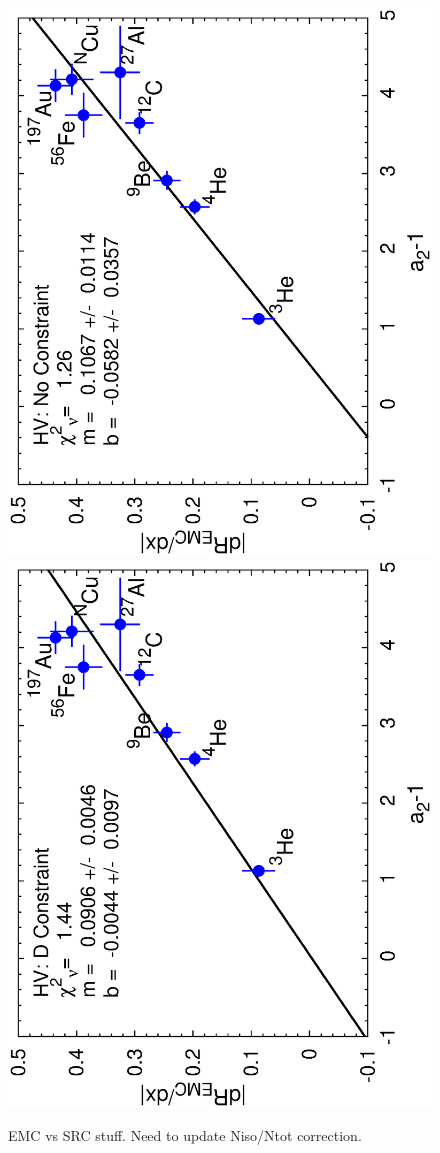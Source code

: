 \begin{figure}[htbp]
\begin{center}
\includegraphics[angle=-90,width=.46\textwidth]{plots/plotfit_all_norescaling_nocm_rean_final_lp.eps}
\includegraphics[angle=-90,width=.46\textwidth]{plots/plotfit_all_norescaling_nocm_rean_deut_final_lp.eps}
\caption{EMC vs SRC stuff.  Need to update Niso/Ntot correction.}
\label{emc_vs_src}
\end{center}
\end{figure}


